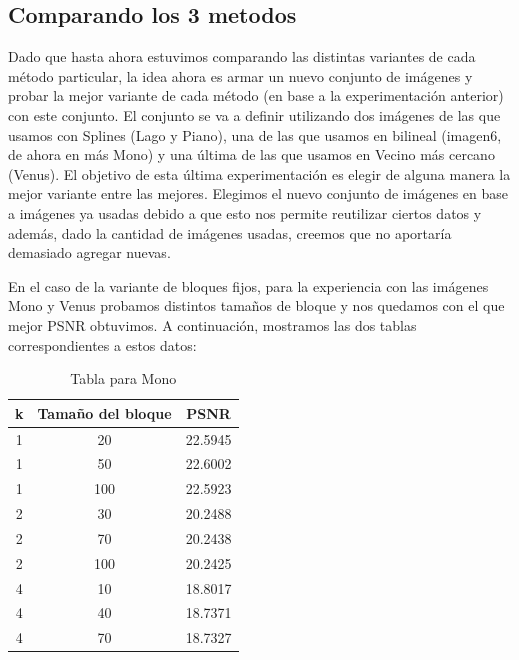 \documentclass[a4paper]{article}
\begin{document}
\subsection{Comparando los 3 metodos}
Dado que hasta ahora estuvimos comparando las distintas variantes de cada método particular, la idea ahora es armar un nuevo conjunto de imágenes y probar la mejor variante de cada método (en base a la experimentación anterior) con este conjunto. El conjunto se va a definir utilizando dos imágenes de las que usamos con Splines (Lago y Piano), una de las que usamos en bilineal (imagen6, de ahora en m\'as Mono) y una última de las que usamos en Vecino más cercano (Venus). El objetivo de esta última experimentación es elegir de alguna manera la mejor variante entre las mejores. Elegimos el nuevo conjunto de imágenes en base a imágenes ya usadas debido a que esto nos permite reutilizar ciertos datos y además, dado la cantidad de imágenes usadas, creemos que no aportaría demasiado agregar nuevas.
\par En el caso de la variante de bloques fijos, para la experiencia con las imágenes Mono y Venus probamos distintos tamaños de bloque y nos quedamos con el que mejor PSNR obtuvimos. A continuación, mostramos las dos tablas correspondientes a estos datos:

\begin{table}[h]
\centering
\label{tabla25}
\begin{tabular}{|c|c|c|}
\hline
k & Tamaño del bloque & PSNR    \\ \hline
1 & 20                & 22.5945 \\ \hline
1 & 50                & 22.6002 \\ \hline
1 & 100               & 22.5923 \\ \hline
2 & 30                & 20.2488 \\ \hline
2 & 70                & 20.2438 \\ \hline
2 & 100               & 20.2425 \\ \hline
4 & 10                & 18.8017 \\ \hline
4 & 40                & 18.7371 \\ \hline
4 & 70                & 18.7327 \\ \hline
\end{tabular}
\caption{Tabla para Mono}
\end{table}
\end{document}
